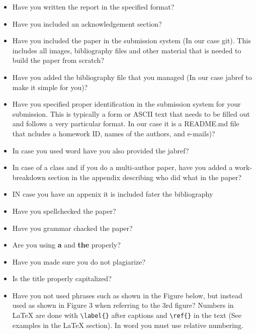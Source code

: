 \begin{itemize}[label=$\Box$]

\item Have you written the report in the specified format?

\item Have you included an acknowledgement section?

\item Have you included the paper in the submission system (In our
  case git). This includes all images, bibliography files and other
  material that is needed to build the paper from scratch?

\item Have you added the bibliography file that you managed (In our
  case jabref to make it simple for you)?

\item Have you specified proper identification in the submission
  system for your submission.  This is typically a form or ASCII text
  that needs to be filled out and follows a very particular format.
  In our case it is a README.md file that ncludes a homework ID, names
  of the authors, and e-mails)?

\item In case you used word have you also provided the jabref?

\item In case of a class and if you do a multi-author paper, have you
  added a work-breakdown section in the appendix describing who did
  what in the paper?

\item IN case you have an appenix it is included fater the bibliography

\item Have you spellchecked the paper?

\item Have you grammar chacked the paper?

\item Are you using \textbf{a} and \textbf{the} properly?

\item Have you made sure you do not plagiarize?

\item Is the title properly capitalized?

\item Have you not used phrases such as shown in the Figure below, but
  instead used as shown in Figure 3 when referring to the 3rd figure?
  Numbers in LaTeX are done with \verb|\label{}| after captions and
  \verb|\ref{}| in the text (See examples in the LaTeX section). In
  word you must use relative numbering.


\end{itemize}
